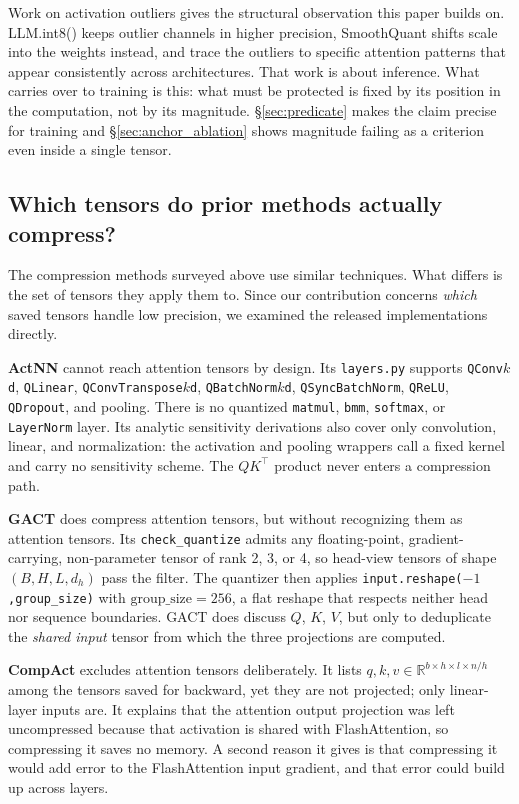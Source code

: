 \documentclass[11pt,letterpaper]{article}
\begin{document}
Work on activation outliers gives the structural observation this paper builds on. LLM.int8() \citep{dettmers2022llmint8} keeps outlier channels in higher precision, SmoothQuant \citep{xiao2023smoothquant} shifts scale into the weights instead, and \citet{bondarenko2023quantizable} trace the outliers to specific attention patterns that appear consistently across architectures. That work is about inference. What carries over to training is this: what must be protected is fixed by its position in the computation, not by its magnitude. \S\ref{sec:predicate} makes the claim precise for training and \S\ref{sec:anchor_ablation} shows magnitude failing as a criterion even inside a single tensor.


\subsection{Which tensors do prior methods actually compress?}
\label{sec:related_which}
The compression methods surveyed above use similar techniques. What differs is the set of tensors they apply them to. Since our contribution concerns \emph{which} saved tensors handle low precision, we examined the released implementations directly. 


\textbf{ActNN} cannot reach attention tensors by design. Its \texttt{layers.py} supports \texttt{QConv$k$d}, \texttt{QLinear}, \texttt{QConvTranspose$k$d}, \texttt{QBatchNorm$k$d}, \texttt{QSyncBatchNorm}, \texttt{QReLU}, \texttt{QDropout}, and pooling. There is no quantized \texttt{matmul}, \texttt{bmm}, \texttt{softmax}, or \texttt{LayerNorm} layer. Its analytic sensitivity derivations also cover only convolution, linear, and normalization: the activation and pooling wrappers call a fixed kernel and carry no sensitivity scheme. The $QK^\top$ product never enters a compression path.


\textbf{GACT} does compress attention tensors, but without recognizing them as attention tensors. Its \texttt{check\_\allowbreak quantize} admits any floating-point, gradient-carrying, non-parameter tensor of rank 2, 3, or 4, so head-view tensors of shape $(B, H, L, d_h)$ pass the filter. The quantizer then applies \texttt{input.reshape(}\allowbreak\texttt{$-1$,}\allowbreak\texttt{group\_size)} with $\text{group\_size}=256$, a flat reshape that respects neither head nor sequence boundaries. GACT does discuss $Q$, $K$, $V$, but only to deduplicate the \emph{shared input} tensor from which the three projections are computed. 


\textbf{CompAct} excludes attention tensors deliberately. It lists $q, k, v \in \mathbb{R}^{b \times h \times l \times n/h}$ among the tensors saved for backward, yet they are not projected; only linear-layer inputs are. It explains that the attention output projection was left uncompressed because that activation is shared with FlashAttention, so compressing it saves no memory. A second reason it gives is that compressing it would add error to the FlashAttention input gradient, and that error could build up across layers. 
\end{document}
